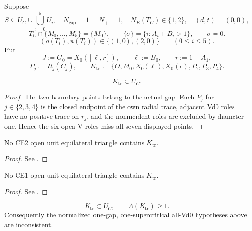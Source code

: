 Suppose
\[
 S\subseteq U_C\cup\bigcup_{i=0}^5U_i,
 \quad N_{\mathrm{gap}}=1,
 \quad N_+=1,
 \quad N_E(T_C)\in\{1,2\},
 \quad(d,t)=(0,0),
\]
\[
 T_C\cap\{M_0,\ldots,M_5\}=\{M_0\},
 \qquad \{\sigma\}=\{i:A_i+B_i>1\},
 \qquad \sigma=0.
\]
\[
 (o(T_i),n(T_i))\in\{(1,0),(2,0)\}
 \qquad(0\le i\le5).
\]
Put
\[
 J:=G_0=X_0([\ell,r]),
 \qquad \ell:=B_0,
 \qquad r:=1-A_1,
\]
\[
 P_j:=R_j(C_j),
 \qquad
 K_{\mathrm{tr}}:=
 \{O,M_0,X_0(\ell),X_0(r),P_2,P_3,P_4\}.
\]

\begin{lemma}
\label{lem:readable-k410-forced}
\[
 K_{\mathrm{tr}}\subset U_C.
\]
\end{lemma}

\begin{proof}
The two boundary points belong to the actual gap.  Each $P_j$ for
$j\in\{2,3,4\}$ is the closed endpoint of the own radial trace, adjacent Vd0
roles have no positive trace on $r_j$, and the nonincident roles are excluded
by diameter one.  Hence the six open V roles miss all seven displayed points.
\end{proof}



\begin{proposition}
\label{prop:readable-k410-ce2}
No CE2 open unit equilateral triangle contains $K_{\mathrm{tr}}$.
\end{proposition}

\begin{proof}
See .
\end{proof}

\begin{proposition}
\label{prop:readable-k410-ce1}
No CE1 open unit equilateral triangle contains $K_{\mathrm{tr}}$.
\end{proposition}

\begin{proof}
See .
\end{proof}

\begin{proposition}
\label{prop:new-nplus-one-all-vd0}
\[
 K_{\mathrm{tr}}\subset U_C,
 \qquad \Lambda(K_{\mathrm{tr}})\ge1.
\]
Consequently the normalized one-gap, one-supercritical all-Vd0 hypotheses
above are inconsistent.
\end{proposition}

